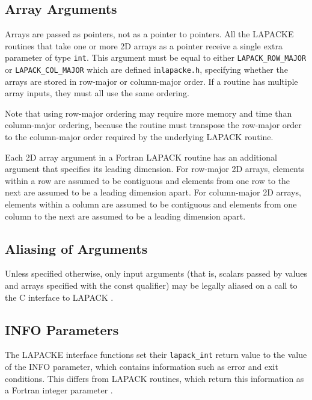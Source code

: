 \subsection{Array Arguments}

Arrays are passed as pointers, not as a pointer to pointers. 
All the LAPACKE routines that take one or more 2D arrays as a pointer receive a single extra parameter of type {\tt int}. This argument must be equal to either {\tt LAPACK\_ROW\_MAJOR} or {\tt LAPACK\_COL\_MAJOR} which are defined in{\tt  lapacke.h}, specifying whether the arrays are stored in row-major or column-major order. If a routine has multiple array inputs, they must all use the same ordering.

Note that using row-major ordering may require more memory and time than column-major ordering, because the routine must transpose the row-major order to the column-major order required by the underlying LAPACK routine.

Each 2D array argument in a Fortran LAPACK routine has an additional argument that specifies its leading dimension. For row-major 2D arrays, elements within a row are assumed to be contiguous and elements from one row to the next are assumed to be a leading dimension apart. For column-major 2D arrays, elements within a column are assumed to be contiguous and elements from one column to the next are assumed to be a leading dimension apart.

\subsection{Aliasing of Arguments}

Unless specified otherwise, only input arguments (that is, scalars passed by values and arrays specified with the const qualifier) may be legally aliased on a call to the C interface to LAPACK
.

\subsection{INFO Parameters}

The LAPACKE interface functions set their {\tt lapack\_int} return value to the value of the INFO parameter, which contains information such as error and exit conditions. This differs from LAPACK routines, which return this information as a Fortran integer parameter
.

